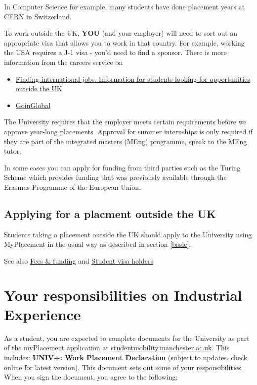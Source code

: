 \documentclass[
]{book}
\providecommand{\tightlist}{%
  \setlength{\itemsep}{0pt}\setlength{\parskip}{0pt}}
\begin{document}
In Computer Science for example, many students have done placement years at CERN in Switzerland. \citep{cern}

To work outside the UK, \textbf{YOU} (and your employer) will need to sort out an appropriate visa that allows you to work in that country. For example, working the USA requires a J-1 visa - you'd need to find a sponsor. There is more information from the careers service on

\begin{itemize}
\tightlist
\item
  \href{https://www.careers.manchester.ac.uk/international/internationaljobs/}{Finding international jobs. Information for students looking for opportunities outside the UK} \citep{interjobs}
\item
  \href{https://www.careers.manchester.ac.uk/international/goinglobal/}{GoinGlobal} \citep{goinglobal}
\end{itemize}

The University requires that the employer meets certain requirements before we approve year-long placements. Approval for summer internships is only required if they are part of the integrated masters (MEng) programme, speak to the MEng tutor.

In some cases you can apply for funding from third parties such as the Turing Scheme which provides funding that was previously available through the Erasmus Programme of the European Union. \citep{turing}

\section{Applying for a placment outside the UK}\label{applying-for-a-placment-outside-the-uk}

Students taking a placement outside the UK should apply to the University using MyPlacement in the usual way as described in section \ref{basic}.

See also \href{https://www.manchester.ac.uk/study/undergraduate/fees-and-funding/}{Fees \& funding} and \href{https://www.studentsupport.manchester.ac.uk/immigration-and-visas/}{Student visa holders}

\chapter{Your responsibilities on Industrial Experience}\label{you}

As a student, you are expected to complete documents for the University as part of the myPlacement application at \href{https://studentmobility.manchester.ac.uk/}{studentmobility.manchester.ac.uk}. This includes: \textbf{UNIV+: Work Placement Declaration }(subject to updates, check online for latest version). This document sets out some of your responsibilities. When you sign the document, you agree to the following:
\end{document}
